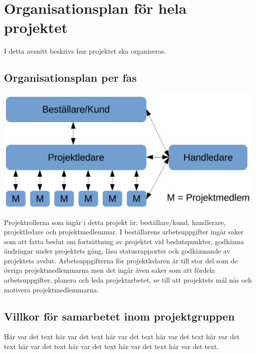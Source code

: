 \documentclass[a4paper,titlepage,12pt]{article}
\begin{document}
	
	\section{Organisationsplan för hela projektet}
    I detta avsnitt beskrivs hur projektet ska organiseras.

	\subsection{Organisationsplan per fas}
  \begin{center}
  \includegraphics[width=0.8\linewidth]{images/projectroles.png}
  \end{center}
	Projektrollerna som ingår i detta projekt är: beställare/kund, handlerare,
  projektledare och projektmedlemmar. I beställarens arbetsuppgifter ingår saker
  som att fatta beslut om fortsättning av projektet vid beslutspunkter, godkänna
  ändringar under projektets gång, läsa statusrapporter och godkännande av
  projektets avslut. Arbetsuppgifterna för projektledaren är till stor del som
  de övriga projektmedlemmarna men det ingår även saker som att fördela
  arbetsuppgifter, planera och leda projektarbetet, se till att projektets mål
  nås och motivera projektmedlemmarna.
	
	 
	\subsection{Villkor för samarbetet inom projektgruppen}
	Här var det text här var det text här var det text
	här var det text här var det text här var det text
	här var det text här var det text här var det text.
	
\end{document}
